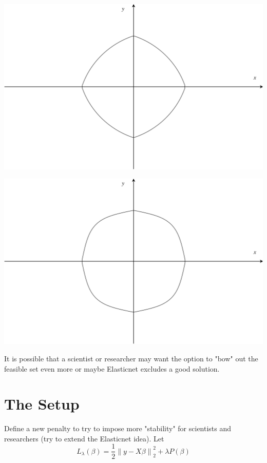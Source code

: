 \documentclass[10pt, reqno]{article}
\numberwithin{equation}{section}
\newcommand{\norm}[1]{\left\lVert#1\right\rVert}
\begin{document}
\vspace{.5cm}
\begin{center}
\begin{minipage}{.5\textwidth}
  \centering
  \includegraphics[width=.9\linewidth]{elasticnet.png}
\end{minipage}%
\begin{minipage}{.5\textwidth}
  \centering
  \includegraphics[width=.9\linewidth]{new_penalty_4_moment.png}
\end{minipage}
\end{center}
\vspace{.5cm}

It is possible that a scientist or researcher may want the option to "bow" out the feasible set even more or maybe Elasticnet \cite{elasticnet} excludes a good solution.

\newpage
\section*{The Setup}

Define a new penalty to try to impose more "stability" for scientists and researchers (try to extend the Elasticnet \cite{elasticnet} idea). Let
\[
L_{\lambda}(\beta) = \frac{1}{2} \norm{y - X \beta}_2^2 + \lambda P(\beta)
\]
\end{document}
